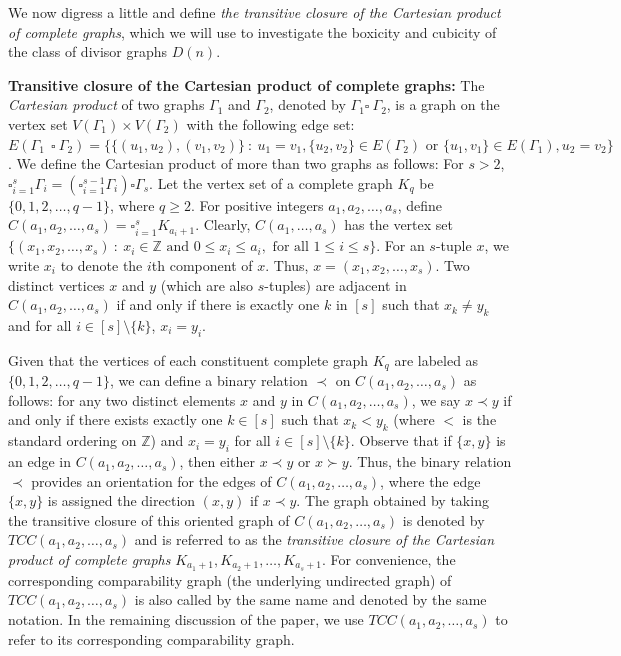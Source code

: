 \documentclass[twoside, 11pt]{article}
\newcommand{\TT}{TCC(a_1,a_2,\dots,a_s)}
\newcommand{\G}{\Gamma}
\newcommand{\Z}{\mathbb{Z}}
\begin{document}
We now digress a little and define \textit{the transitive closure of the Cartesian product of complete graphs}, which we will use to investigate the boxicity and cubicity of the class of divisor graphs $D(n)$.

\vspace{0.3cm}

\noindent \textbf{Transitive closure of the Cartesian product of complete graphs:} The \textit{Cartesian product} of two
graphs $\G_1$ and $\G_2$, denoted  by $\G_1 \square \ \G_2$, is a graph on the vertex set
$V(\G_1) \times V(\G_2)$ with the following edge set: $E(\G_1 \ \ \square \ \G_2) = \{\{(u_1, u_2),(v_1, v_2)\} \ : \ u_1 = v_1, \{u_2,v_2\} \in E(\G_2) \text{ or }
\{u_1,v_1\} \in E(\G_1), u_2 = v_2\}$. We define the Cartesian product of more than two graphs as follows: For $s > 2$,  $\square_{i=1}^{s} \G_i = (\square_{i=1}^{s-1} \G_i) \square \G_s$.  Let the vertex set of a complete graph $K_q$ be $\{0,1,2,\dots,q-1\}$, where $q \geq 2$. For positive integers $a_1,a_2, \ldots, a_s$, define  $ C(a_1,a_2, \ldots, a_s) = \square_{i=1}^{s}K_{a_i+1}$. Clearly, $C(a_1,\ldots,a_s)$  has the vertex set  $\{(x_1,x_2,\dots,x_s) \ : \ x_i \in \Z \text{ and } 0 \leq x_i \leq a_i, \text{ for all } 1 \leq i \leq s\}$. For an $s$-tuple $x$, we write $x_i$ to denote the $i$th component of $x$. Thus,  $x=(x_1,x_2,\dots,x_s)$. Two distinct vertices $x$ and $y$ (which are also $s$-tuples) are adjacent in $C(a_1,a_2,\dots,a_s)$ if and only if there is exactly one $k$ in $[s]$ such that $x_k \ne y_k$  and for all $i \in [s]\setminus \{k\}$, $x_i=y_i$. 


Given that the vertices of each constituent complete graph \( K_q \) are labeled as \( \{0, 1, 2, \dots, q-1\} \), we can define a binary relation \( \prec \) on \( C(a_1, a_2, \dots, a_s) \) as follows: for any two distinct elements \( x \) and \( y \) in \( C(a_1, a_2, \dots, a_s) \), we say \( x \prec y \) if and only if there exists exactly one \( k \in [s] \) such that \( x_k < y_k \) (where \( < \) is the standard ordering on \( \mathbb{Z} \)) and \( x_i = y_i \) for all \( i \in [s] \setminus \{k\} \). Observe that if \( \{x, y\} \) is an edge in \( C(a_1, a_2, \dots, a_s) \), then either \( x \prec y \) or \( x \succ y \). Thus, the binary relation \( \prec \) provides an orientation for the edges of \( C(a_1, a_2, \dots, a_s) \), where the edge \( \{x, y\} \) is assigned the direction \( (x, y) \) if \( x \prec y \). The graph obtained by taking the transitive closure of this oriented graph of $C(a_1,a_2,\dots,a_s)$ is denoted by \( TCC(a_1, a_2, \dots, a_s) \) and is referred to as the \textit{transitive closure of the Cartesian product of complete graphs} \( K_{a_1+1}, K_{a_2+1}, \dots, K_{a_s+1} \). For convenience, the corresponding comparability graph (the underlying undirected graph) of $\TT$ is also called by the same name and denoted by the same notation. In the remaining discussion of the paper, we use $\TT$ to refer to its corresponding comparability graph.
\end{document}

